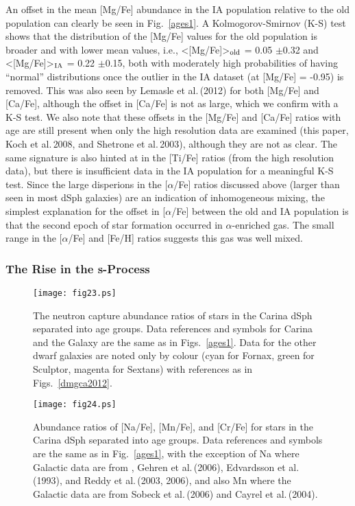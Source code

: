 \documentclass{emulateapj}
\newcommand\etal{{\rm et al.\,}}
\begin{document}
An offset in the mean [Mg/Fe] abundance in the IA population relative to the
old population can clearly be seen in Fig.~\ref{ages1}. 
A Kolmogorov-Smirnov (K-S) test shows that the distribution of the [Mg/Fe] 
values for the old population is broader and with lower mean values, i.e.,
<[Mg/Fe]>$_{\rm old}$ = 0.05 $\pm$0.32 
and <[Mg/Fe]>$_{\rm IA}$ = 0.22 $\pm$0.15, both with moderately high 
probabilities of having ``normal'' distributions once the outlier in the 
IA dataset (at [Mg/Fe] = -0.95) is removed. 
This was also seen by Lemasle \etal (2012) for both [Mg/Fe] and [Ca/Fe],
although the offset in [Ca/Fe] is not as large, which we confirm with a
K-S test. 
We also note that these offsets in the [Mg/Fe] and [Ca/Fe] ratios with 
age are still present when only the high resolution data are examined 
(this paper, Koch \etal 2008, and Shetrone \etal 2003), although they are
not as clear.
The same signature is also hinted at in the [Ti/Fe] ratios 
(from the high resolution data), but there is insufficient data in 
the IA population for a meaningful K-S test. 
%
Since the large disperions in the [$\alpha$/Fe] ratios discussed above
(larger than seen in most dSph galaxies) are an indication of inhomogeneous
mixing, the simplest explanation for the offset in [$\alpha$/Fe]
between the old and IA population is that the second epoch of star formation
occurred in $\alpha$-enriched gas.   The small range in the [$\alpha$/Fe] 
and [Fe/H] ratios suggests this gas was well mixed.


\subsubsection {The Rise in the s-Process}


\begin{figure}[t]
\begin{center}
\texttt{[image: fig23.ps]}
\caption{The neutron capture abundance ratios of stars in the Carina 
dSph separated into age groups.  Data references and symbols for Carina 
and the Galaxy are the same as in Figs.~\ref{ages1}. 
Data for the other dwarf galaxies are noted only by colour
(cyan for Fornax, green for Sculptor, magenta for Sextans) 
with references as in Figs.~\ref{dmgca2012}. \\
}
\label{ages3}
\end{center}
\end{figure}


\begin{figure}[t]
\begin{center}
\texttt{[image: fig24.ps]}
\caption{Abundance ratios of [Na/Fe], [Mn/Fe], and [Cr/Fe]
for stars in the Carina dSph separated into age groups. 
Data references and symbols are the same as in 
Fig.~\ref{ages1}, with the exception of Na where 
Galactic data are from \citep{And07},
Gehren \etal (2006), Edvardsson \etal (1993), and
Reddy \etal (2003, 2006), and also Mn where the
Galactic data are from Sobeck \etal (2006) and
Cayrel \etal (2004). \\
}
\label{ages2}
\end{center}
\end{figure}
\end{document}
